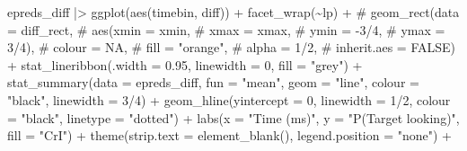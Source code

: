 \documentclass[
  letterpaper,
  DIV=11,
  numbers=noendperiod]{scrartcl}
\newenvironment{Shaded}{\begin{snugshade}}{\end{snugshade}}
\newcommand{\AttributeTok}[1]{\textcolor[rgb]{0.40,0.45,0.13}{#1}}
\newcommand{\CommentTok}[1]{\textcolor[rgb]{0.37,0.37,0.37}{#1}}
\newcommand{\DecValTok}[1]{\textcolor[rgb]{0.68,0.00,0.00}{#1}}
\newcommand{\FloatTok}[1]{\textcolor[rgb]{0.68,0.00,0.00}{#1}}
\newcommand{\FunctionTok}[1]{\textcolor[rgb]{0.28,0.35,0.67}{#1}}
\newcommand{\NormalTok}[1]{\textcolor[rgb]{0.00,0.23,0.31}{#1}}
\newcommand{\SpecialCharTok}[1]{\textcolor[rgb]{0.37,0.37,0.37}{#1}}
\newcommand{\StringTok}[1]{\textcolor[rgb]{0.13,0.47,0.30}{#1}}
\begin{document}
\begin{Shaded}
\begin{Highlighting}[]
\NormalTok{    epreds\_diff }\SpecialCharTok{|\textgreater{}} 
    \FunctionTok{ggplot}\NormalTok{(}\FunctionTok{aes}\NormalTok{(timebin, diff)) }\SpecialCharTok{+}
    \FunctionTok{facet\_wrap}\NormalTok{(}\SpecialCharTok{\textasciitilde{}}\NormalTok{lp) }\SpecialCharTok{+}
    \CommentTok{\# geom\_rect(data = diff\_rect,}
    \CommentTok{\#         aes(xmin = xmin,}
    \CommentTok{\#           xmax = xmax,}
    \CommentTok{\#           ymin = {-}3/4,}
    \CommentTok{\#           ymax = 3/4),}
    \CommentTok{\#         colour = NA,}
    \CommentTok{\#         fill = "orange",}
    \CommentTok{\#         alpha = 1/2,}
    \CommentTok{\#         inherit.aes = FALSE) +}
    \FunctionTok{stat\_lineribbon}\NormalTok{(}\AttributeTok{.width =} \FloatTok{0.95}\NormalTok{,}
                    \AttributeTok{linewidth =} \DecValTok{0}\NormalTok{,}
                    \AttributeTok{fill =} \StringTok{"grey"}\NormalTok{) }\SpecialCharTok{+}
    \FunctionTok{stat\_summary}\NormalTok{(}\AttributeTok{data =}\NormalTok{ epreds\_diff,}
                 \AttributeTok{fun =} \StringTok{"mean"}\NormalTok{,}
                 \AttributeTok{geom =} \StringTok{"line"}\NormalTok{,}
                 \AttributeTok{colour =} \StringTok{"black"}\NormalTok{,}
                 \AttributeTok{linewidth =} \DecValTok{3}\SpecialCharTok{/}\DecValTok{4}\NormalTok{) }\SpecialCharTok{+}
    \FunctionTok{geom\_hline}\NormalTok{(}\AttributeTok{yintercept =} \DecValTok{0}\NormalTok{, }
               \AttributeTok{linewidth =} \DecValTok{1}\SpecialCharTok{/}\DecValTok{2}\NormalTok{,}
               \AttributeTok{colour =} \StringTok{"black"}\NormalTok{,}
               \AttributeTok{linetype =} \StringTok{"dotted"}\NormalTok{) }\SpecialCharTok{+}
    \FunctionTok{labs}\NormalTok{(}\AttributeTok{x =} \StringTok{"Time (ms)"}\NormalTok{,}
         \AttributeTok{y =} \StringTok{"P(Target looking)"}\NormalTok{,}
         \AttributeTok{fill =} \StringTok{"CrI"}\NormalTok{) }\SpecialCharTok{+}
    \FunctionTok{theme}\NormalTok{(}\AttributeTok{strip.text =} \FunctionTok{element\_blank}\NormalTok{(),}
          \AttributeTok{legend.position =} \StringTok{"none"}\NormalTok{) }\SpecialCharTok{+}
    

\end{Highlighting}
\end{Shaded}
\end{document}
